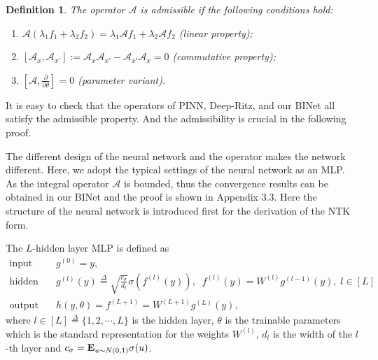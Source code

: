 \documentclass[hyperref]{article}
\newcommand{\pl}{\partial}
\numberwithin{equation}{section}
\theoremstyle{nonumberplain}
\newtheorem{definition}{Definition}[section]
\begin{document}
	
	\begin{definition}\label{def.ad}
		The operator $\mathcal{A}$ is admissible if the following conditions hold: \begin{enumerate}
			\item $\mathcal{A}(\lambda_1 f_1+\lambda_2f_2)=\lambda_1 \mathcal{A}f_1+\lambda_2\mathcal{A}f_2$ (linear property);
			\item $[\mathcal{A}_x, \mathcal{A}_{x'}]:=\mathcal{A}_x\mathcal{A}_{x'}-\mathcal{A}_{x'}\mathcal{A}_x=0$ (commutative property);
			\item $[\mathcal{A},\frac{\pl}{\pl \theta}]=0$ (parameter variant).
		\end{enumerate}
	\end{definition}
	It is easy to check that the operators of PINN, Deep-Ritz, and our BINet all satisfy the admissible property. And the admissibility is crucial in the following proof.
	
	The different design of the neural network and the operator makes the network different. Here, we adopt the typical settings of the neural network as an MLP. As the integral operator $\mathcal{A}$ is bounded, thus the convergence results can be obtained in our BINet and the proof is shown in Appendix 3.3. Here the structure of the neural network is introduced first for the derivation of the NTK form.
	
	The $L$-hidden layer MLP is defined as 
	\begin{align}
		\text{input layer: } & \quad g^{(0)} = y,\\
		\text{hidden layer:} & \quad g^{(l)}(y) \overset{\Delta}{=} \sqrt{\frac{c_\sigma}{d_l}}\sigma(f^{(l)}(y)), \;\; f^{(l)}(y)= W^{(l)}g^{(l-1)}(y), \; l\in[L]\\
		\text{output layer:} & \quad h(y,\theta)=f^{(L+1)}=W^{(L+1)}g^{(L)}(y),
	\end{align}
	where $l\in[L]\overset{\Delta}{=}\{1,2,\cdots,L\}$ is the hidden layer, $\theta$ is the trainable parameters which is the standard representation for the weights $W^{(l)}$, $d_l$ is the width of the $l$-th layer and $c_\sigma={\bf E}_{u\sim N(0,1)}\sigma(u)$. 
	
	
\end{document}
